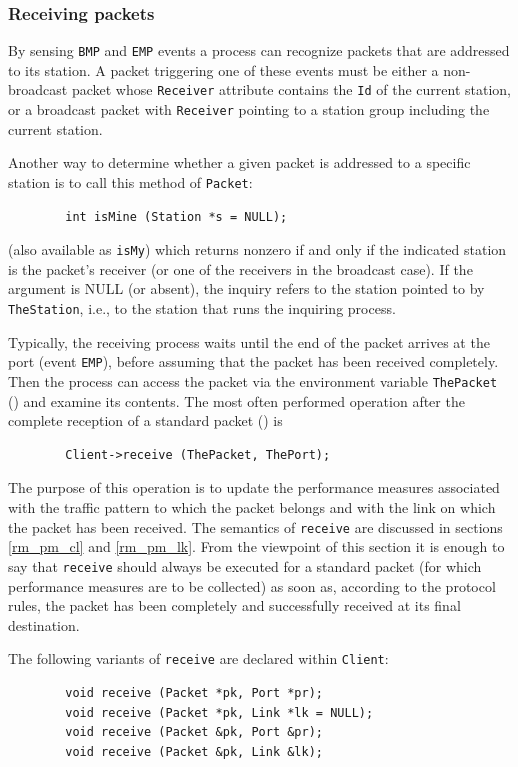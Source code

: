 \subsubsection{Receiving packets}
\label{rm_po_wr_rp}

By sensing {\tt BMP} and {\tt EMP} events a process can recognize packets
that are addressed to its station.
A packet triggering one of these events must be either a non-broadcast
packet whose {\tt Receiver} attribute contains the {\tt Id} of the
current station, or a broadcast packet with {\tt Receiver} pointing to
a station group including the current station.

Another way to determine whether a given
packet is addressed to a specific station
is to call this method of {\tt Packet}:
\begin{verbatim}
        int isMine (Station *s = NULL);
\end{verbatim}
(also available as {\tt isMy}) which returns nonzero if and only if the indicated station is the packet's
receiver (or one of the receivers in the broadcast case).
If the argument is NULL (or absent), the inquiry refers to the station
pointed to by {\tt TheStation}, i.e., to the station that runs the inquiring
process.

Typically, the receiving process waits until the end of the packet arrives
at the port (event {\tt EMP}), before assuming that the packet has been
received completely.
Then the process can access the packet via the environment variable
{\tt ThePacket} () and examine its contents.
The most often performed operation after the complete reception of a 
standard packet () is
\begin{verbatim}
        Client->receive (ThePacket, ThePort);
\end{verbatim}

\noindent
The purpose of this operation is to update the
performance measures associated
with the traffic pattern to which the packet belongs and with the link on which
the packet has been received.
The semantics of {\tt receive} are discussed
in sections \ref{rm_pm_cl} and \ref{rm_pm_lk}.
From the viewpoint of this section it is enough to say that {\tt receive}
should always be executed for a standard packet (for which performance measures
are to be collected) as soon as, according to the protocol rules, the
packet has been completely and successfully received at its final destination.

The following variants of {\tt receive} are declared within {\tt Client}:
\begin{verbatim}
        void receive (Packet *pk, Port *pr);
        void receive (Packet *pk, Link *lk = NULL);
        void receive (Packet &pk, Port &pr);
        void receive (Packet &pk, Link &lk);
\end{verbatim}

